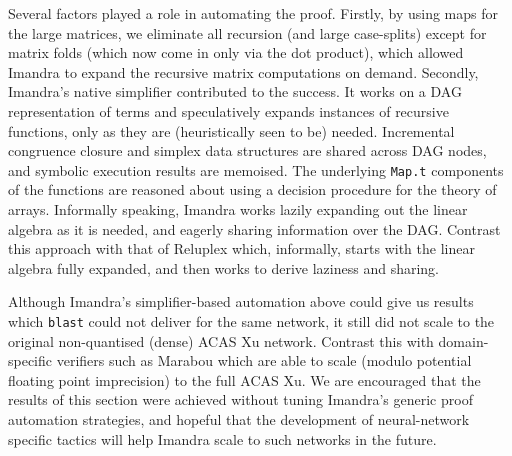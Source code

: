 \documentclass[runningheads]{llncs}
\newcommand{\knote}[1]{\todo[inline, color=blue!20]{#1}}
\begin{document}
Several factors played a role in automating the proof.
Firstly, by using maps for the
large matrices, we eliminate all recursion (and large case-splits) except for
matrix folds (which now come in only via the dot product), which allowed Imandra
to expand the recursive matrix computations on demand.
Secondly, Imandra's native simplifier contributed to the success. It works on a
DAG representation of terms and speculatively expands instances of recursive
functions, only as they are (heuristically seen to be) needed. Incremental
congruence closure and simplex data structures are shared across DAG nodes, and
symbolic execution results are memoised. The underlying \lstinline{Map.t}
components of the functions are reasoned about using a decision procedure for
the theory of arrays.
Informally speaking, Imandra works lazily expanding out the linear algebra as it is needed, and eagerly sharing information over the DAG.
Contrast this approach with that of Reluplex which, informally, starts with the linear algebra fully expanded, and then works to derive laziness and sharing. 


Although Imandra's simplifier-based automation above could give us results which
\lstinline{blast} could not deliver for the same network, it still did not scale
to the original non-quantised (dense) ACAS Xu network. Contrast this with
domain-specific verifiers such as Marabou which are able to scale (modulo
potential floating point imprecision) to the full ACAS Xu.
We are encouraged that the results of
this section were achieved without tuning Imandra's generic proof automation
strategies, and hopeful that the development of neural-network specific tactics %
will help Imandra
scale to such networks in the future. 
\end{document}
